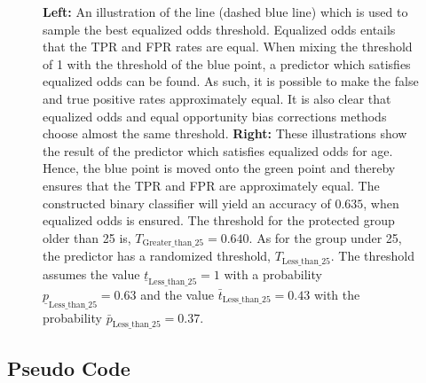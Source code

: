 \documentclass[11pt, fleqn, titlepage]{article}
\begin{document}
\begin{figure}[H]
		\caption{\textbf{Left:} An illustration of the line (dashed blue line) which is used to sample the best equalized odds threshold. Equalized odds entails that the TPR and FPR rates are equal. When mixing the threshold of 1 with the threshold of the blue point, a predictor which satisfies equalized odds can be found. As such, it is possible to make the false and true positive rates approximately equal. It is also clear that equalized odds and equal opportunity bias corrections methods choose almost the same threshold.  \textbf{Right:} These illustrations show the result of the predictor which satisfies equalized odds for age. Hence, the blue point is moved onto the green point and thereby ensures that the TPR and FPR are approximately equal. The constructed binary classifier will yield an accuracy of $ 0.635 $, when equalized odds is ensured. The threshold for the protected group older than 25 is, $ T_{\text{Greater\_than\_25}} = 0.640 $. As for the group under 25, the predictor has a randomized threshold, $ T_{\text{Less\_than\_25}} $. The threshold assumes the value $\underline t_{\text{Less\_than\_25}} = 1 $  with a probability $ \underline p_{\text{Less\_than\_25}}= 0.63 $ and the value $ \bar t_{\text{Less\_than\_25}} = 0.43 $ with the probability $\bar p_{\text{Less\_than\_25}} = 0.37 $.}
		\label{fig:equalizedOdds}
	\end{figure}
	
	\subsection{Pseudo Code}\label{pseudo_code}
\end{document}
